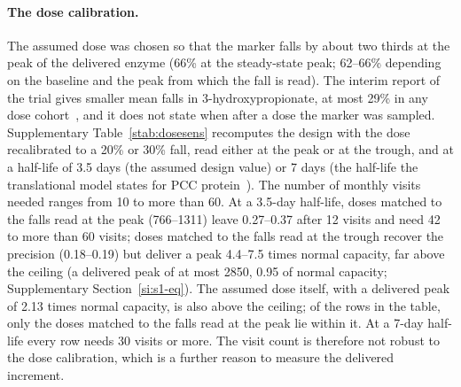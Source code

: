 \paragraph{The dose calibration.} The assumed dose was chosen so that the marker falls by about
two thirds at the peak of the delivered enzyme (66\% at the steady-state peak; 62--66\%
depending on the baseline and the peak from which the fall is read). The interim report of the trial gives
smaller mean falls in 3-hydroxypropionate, at most 29\% in any dose cohort~\cite{trial_phase12},
and it does not state when after a dose the marker was sampled. Supplementary
Table~\ref{stab:dosesens} recomputes the design with the dose recalibrated to a 20\% or 30\% fall,
read either at the peak or at the trough, and at a half-life of 3.5 days (the assumed design
value) or 7 days (the half-life the translational model states for PCC
protein~\cite{pkpd_translational}). The number of
monthly visits needed ranges from 10 to more than 60. At a 3.5-day half-life, doses matched to
the falls read at the peak (766--1311\um) leave 0.27--0.37 after 12 visits and need 42 to more
than 60 visits; doses matched to the falls read at the trough recover the precision (0.18--0.19)
but deliver a peak 4.4--7.5 times normal capacity, far above the ceiling (a delivered peak of
at most 2850\um, 0.95 of normal capacity; Supplementary Section~\ref{si:s1-eq}). The assumed
dose itself, with a
delivered peak of 2.13 times normal capacity, is also above the ceiling; of the rows in the
table, only the doses matched to the falls read at the peak lie within it. At a 7-day half-life
every row needs 30 visits or more. The visit count is therefore not robust to the dose
calibration, which is a further reason to measure the delivered increment.

